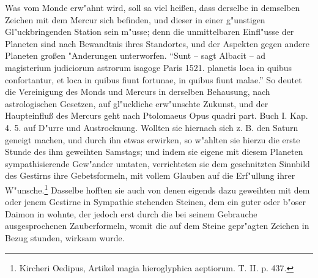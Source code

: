 \documentclass[a4paper, 11pt, oneside, polutonikogreek, german]{article}
\begin{document}
{\hspace*{0.5cm} Was vom Monde erw"ahnt wird, soll sa viel heißen, dass derselbe in demselben Zeichen mit dem Mercur sich befinden, und dieser in einer g"unstigen Gl"uckbringenden Station sein m"usse; denn die unmittelbaren Einfl"usse der Planeten sind nach Bewandtnis ihres Standortes, und der Aspekten gegen andere Planeten großen "Anderungen unterworfen. "`Sunt -- sagt Albacit -- ad magisterium judiciorum astrorum isagoge Paris 1521. planetis loca in quibus confortantur, et loca in quibus fiunt fortunae, in quibus fiunt malae."' So deutet die Vereinigung des Monds und Mercurs in derselben Behausung, nach astrologischen Gesetzen, auf gl"uckliche erw"unschte Zukunst, und der Haupteinfluß des Mercurs geht nach Ptolomaeus Opus quadri part. Buch I. Kap. 4. 5. auf D"urre und Austrocknung.} Wollten sie hiernach sich z. B. den Saturn geneigt machen, und durch ihn etwas erwirken, so w"ahlten sie hierzu die erste Stunde des ihm geweihten Samstags; und indem sie eigene mit diesem Planeten sympathisierende Gew"ander umtaten, verrichteten sie dem geschnitzten Sinnbild des Gestirns ihre Gebetsformeln, mit vollem Glauben auf die Erf"ullung ihrer W"unsche.\footnote{Kircheri Oedipus, Artikel magia hieroglyphica aeptiorum. T. II. p. 437.} Dasselbe hofften sie auch von denen eigends dazu geweihten mit dem oder jenem Gestirne in Sympathie stehenden Steinen, dem ein guter oder b"oser Daimon in wohnte, der jedoch erst durch die bei seinem Gebrauche ausgesprochenen Zauberformeln, womit die auf dem Steine gepr"agten Zeichen in Bezug stunden, wirksam wurde.
\end{document}
